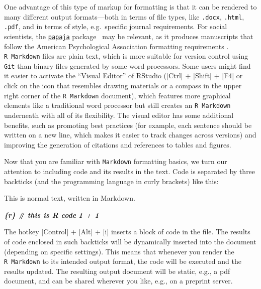 \documentclass[psych,tutorial,accept,moreauthors,pdftex]{Definitions/mdpi}
\newenvironment{Shaded}{\begin{snugshade}}{\end{snugshade}}
\newcommand{\InformationTok}[1]{\textcolor[rgb]{0.56,0.35,0.01}{\textbf{\textit{#1}}}}
\newcommand{\NormalTok}[1]{#1}
\begin{document}
\begin{paracol}{2}
One advantage of this type of markup for formatting is that it can be
rendered to many different output formats---both in terms of file types,
like \texttt{.docx}, \texttt{.html}, \texttt{.pdf}, and in terms of
style, e.g.~specific journal requirements. For social scientists, the
\href{https://github.com/crsh/papaja}{\texttt{papaja}} package~\citep{papaja} may be relevant, as it produces manuscripts that follow
the American Psychological Association formatting requirements
\citep{apa7}. \texttt{R\ Markdown} files are plain text, which is more
suitable for version control using \texttt{Git} than binary files
generated by some word processors. Some users might find it easier to
activate the ``Visual Editor'' of RStudio ({[}Ctrl{]} + {[}Shift{]} +
{[}F4{]} or click on the icon that resembles drawing materials or a
compass in the upper right corner of the \texttt{R\ Markdown} document),
which features more graphical elements like a traditional word processor
but still creates an \texttt{R\ Markdown} underneath with all of its
flexibility. The visual editor has some additional benefits, such as
promoting best practices (for example, each sentence should be written
on a new line, which makes it easier to track changes across versions)
and improving the generation of citations and references to tables and
figures.

Now that you are familiar with \texttt{Markdown} formatting basics, we
turn our attention to including code and its results in the text. Code
is separated by three backticks (and the programming language in curly
brackets) like this:

\begin{adjustwidth}{0.5cm}{0cm} 
\begin{Shaded}
\begin{Highlighting}[]
\NormalTok{This is normal text, written in Markdown.}

\InformationTok{\textasciigrave{}\textasciigrave{}\textasciigrave{}\{r\}}
\InformationTok{\# this is R code}
\InformationTok{1 + 1}
\InformationTok{\textasciigrave{}\textasciigrave{}\textasciigrave{}}
\end{Highlighting}
\end{Shaded}
\end{adjustwidth}

The hotkey {[}Control{]} + {[}Alt{]} + {[}i{]} inserts a block of code in
the file. The results of code enclosed in such backticks will be
dynamically inserted into the document (depending on specific settings).
This means that whenever you render the \texttt{R\ Markdown} to its
intended output format, the code will be executed and the results
updated. The resulting output document will be static, e.g., a pdf
document, and can be shared wherever you like, e.g., on a preprint
server.


\end{paracol}
\end{document}
